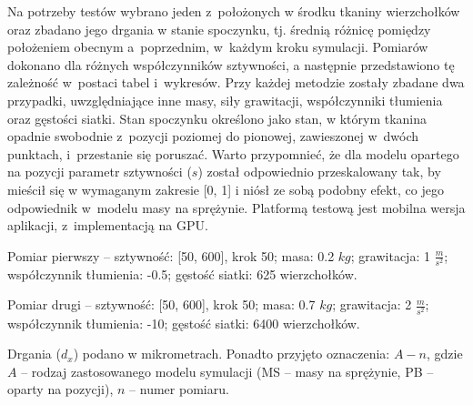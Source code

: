 		Na potrzeby testów wybrano jeden z~położonych w środku tkaniny wierzchołków oraz zbadano jego drgania w stanie spoczynku, tj. średnią różnicę pomiędzy położeniem obecnym a~poprzednim, w~każdym kroku symulacji. Pomiarów dokonano dla różnych współczynników sztywności, a następnie przedstawiono tę zależność w~postaci tabel i~wykresów. Przy każdej metodzie zostały zbadane dwa przypadki, uwzględniające inne masy, siły grawitacji, współczynniki tłumienia oraz gęstości siatki. Stan spoczynku określono jako stan, w którym tkanina opadnie swobodnie z~pozycji poziomej do pionowej, zawieszonej w~dwóch punktach, i~przestanie się poruszać. Warto przypomnieć, że dla modelu opartego na pozycji parametr sztywności (\(s\)) został odpowiednio przeskalowany tak, by mieścił się w wymaganym zakresie [0, 1] i niósł ze sobą podobny efekt, co jego odpowiednik w~modelu masy na sprężynie. Platformą testową jest mobilna wersja aplikacji, z~implementacją na GPU.
		\newline
		
		Pomiar pierwszy -- sztywność: [50, 600], krok 50; masa: 0.2 \(kg\); grawitacja: 1 \(\frac{m}{s^2}\); współczynnik tłumienia: -0.5; gęstość siatki: 625 wierzchołków.
		
		Pomiar drugi -- sztywność: [50, 600], krok 50; masa: 0.7 \(kg\); grawitacja: 2 \(\frac{m}{s^2}\); współczynnik tłumienia: -10; gęstość siatki: 6400 wierzchołków.
		\newline
		
		Drgania (\(d_{x}\)) podano w mikrometrach. Ponadto przyjęto oznaczenia: \(A-n\), gdzie \(A\) -- rodzaj zastosowanego modelu symulacji (MS -- masy na sprężynie, PB -- oparty na pozycji), \(n\) -- numer pomiaru.
		\newline
		
		
		\pagebreak
		
